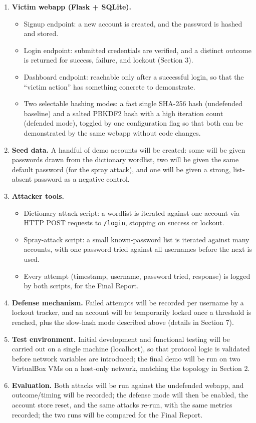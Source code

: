 \documentclass[11pt]{article}
\begin{document}
\begin{enumerate}[leftmargin=*]
  \item \textbf{Victim webapp (Flask + SQLite).}
    \begin{itemize}[leftmargin=*]
      \item Signup endpoint: a new account is created, and the password is hashed
        and stored.
      \item Login endpoint: submitted credentials are verified, and a distinct
        outcome is returned for success, failure, and lockout (Section 3).
      \item Dashboard endpoint: reachable only after a successful login, so that the
        ``victim action'' has something concrete to demonstrate.
      \item Two selectable hashing modes: a fast single SHA-256 hash (undefended
        baseline) and a salted PBKDF2 hash with a high iteration count (defended
        mode), toggled by one configuration flag so that both can be demonstrated by
        the same webapp without code changes.
    \end{itemize}
  \item \textbf{Seed data.} A handful of demo accounts will be created: some will be
    given passwords drawn from the dictionary wordlist, two will be given the same
    default password (for the spray attack), and one will be given a strong,
    list-absent password as a negative control.
  \item \textbf{Attacker tools.}
    \begin{itemize}[leftmargin=*]
      \item Dictionary-attack script: a wordlist is iterated against one account via
        HTTP POST requests to \texttt{/login}, stopping on success or lockout.
      \item Spray-attack script: a small known-password list is iterated against
        many accounts, with one password tried against all usernames before the
        next is used.
      \item Every attempt (timestamp, username, password tried, response) is logged
        by both scripts, for the Final Report.
    \end{itemize}
  \item \textbf{Defense mechanism.} Failed attempts will be recorded per username by
    a lockout tracker, and an account will be temporarily locked once a threshold is
    reached, plus the slow-hash mode described above (details in Section 7).
  \item \textbf{Test environment.} Initial development and functional testing will be
    carried out on a single machine (localhost), so that protocol logic is validated
    before network variables are introduced; the final demo will be run on two
    VirtualBox VMs on a host-only network, matching the topology in Section 2.
  \item \textbf{Evaluation.} Both attacks will be run against the undefended webapp,
    and outcome/timing will be recorded; the defense mode will then be enabled, the
    account store reset, and the same attacks re-run, with the same metrics recorded;
    the two runs will be compared for the Final Report.
\end{enumerate}
\end{document}

